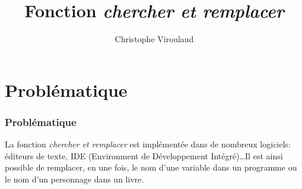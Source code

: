 \documentclass[svgnames,11pt]{beamer}
\author[]{Christophe Viroulaud}
\title{Fonction \emph{chercher et remplacer}}
\date{}
\institute{Terminale - NSI}
\begin{document}
\begin{frame}
\titlepage
{}
\end{frame}

\section{Problématique}
\begin{frame}
    \frametitle{Problématique}

    La fonction \emph{chercher et remplacer} est implémentée dans de nombreux logiciels: éditeurs de texte, IDE (Environment de Développement Intégré)\dots Il est ainsi possible de remplacer, en une fois, le nom d'une variable dans un programme ou le nom d'un personnage dans un livre.

    \begin{center}
    \end{center}

\end{frame}
\end{document}

